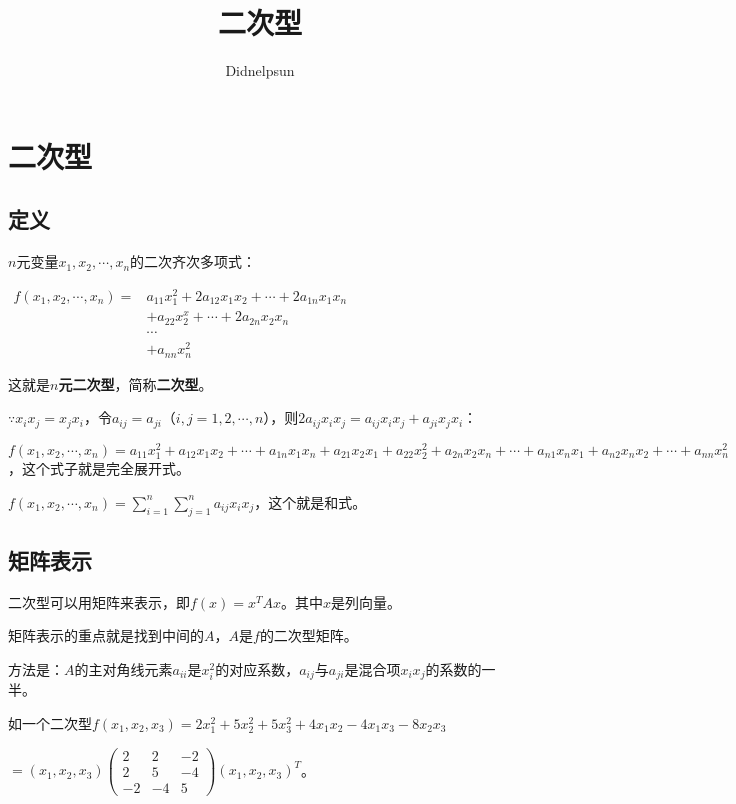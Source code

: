 \documentclass[UTF8, 12pt]{ctexart}
\author{Didnelpsun}
\title{二次型}
\date{}
\begin{document}
\maketitle
\pagestyle{empty}
\thispagestyle{empty}
\tableofcontents
\thispagestyle{empty}
\newpage
\pagestyle{plain}
\setcounter{page}{1}
\section{二次型}

\subsection{定义}

$n$元变量$x_1,x_2,\cdots,x_n$的二次齐次多项式：

$
\begin{array}{cr}
    f(x_1,x_2,\cdots,x_n)= & a_{11}x_1^2+2a_{12}x_1x_2+\cdots+2a_{1n}x_1x_n \\
    & +a_{22}x_2^x+\cdots+2a_{2n}x_2x_n \\
    & \cdots \\
    & +a_{nn}x_n^2
\end{array}
$

这就是\textbf{$n$元二次型}，简称\textbf{二次型}。

$\because x_ix_j=x_jx_i$，令$a_{ij}=a_{ji}$（$i,j=1,2,\cdots,n$），则$2a_{ij}x_ix_j=a_{ij}x_ix_j+a_{ji}x_jx_i$：

$f(x_1,x_2,\cdots,x_n)=a_{11}x_1^2+a_{12}x_1x_2+\cdots+a_{1n}x_1x_n+a_{21}x_2x_1+a_{22}x_2^2+a_{2n}x_2x_n+\cdots+a_{n1}x_nx_1+a_{n2}x_nx_2+\cdots+a_{nn}x_n^2$，这个式子就是完全展开式。

$f(x_1,x_2,\cdots,x_n)=\sum\limits_{i=1}^n\sum\limits_{j=1}^na_{ij}x_ix_j$，这个就是和式。

\subsection{矩阵表示}

二次型可以用矩阵来表示，即$f(x)=x^TAx$。其中$x$是列向量。

矩阵表示的重点就是找到中间的$A$，$A$是$f$的二次型矩阵。

方法是：$A$的主对角线元素$a_{ii}$是$x_i^2$的对应系数，$a_{ij}$与$a_{ji}$是混合项$x_ix_j$的系数的一半。

如一个二次型$f(x_1,x_2,x_3)=2x_1^2+5x_2^2+5x_3^2+4x_1x_2-4x_1x_3-8x_2x_3$

$=(x_1,x_2,x_3)\left(\begin{array}{ccc}
    2 & 2 & -2 \\
    2 & 5 & -4 \\
    -2 & -4 & 5
\end{array}\right)(x_1,x_2,x_3)^T$。
\end{document}
